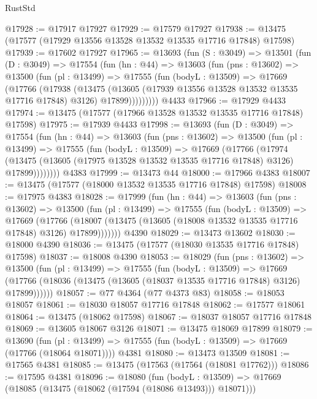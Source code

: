 \begin{lexlean}{RustStd}
\begin{coremodule}
@17928 := @17917 @17927
@17929 := @17579 @17927
@17938 := @13475 (@17577 (@17929 @13556 @13528 @13532 @13535 @17716 @17848) @17598)
@17939 := @17602 @17927
@17965 := @13693
    (fun (S : @3049) =>
    @13501
      (fun (D : @3049) =>
      @17554
        (fun (hn : @44) =>
        @13603
          (fun (pns : @13602) =>
          @13500
            (fun (pl : @13499) =>
            @17555
              (fun (bodyL : @13509) =>
              @17669
                (@17766
                  (@17938
                    (@13475
                      (@13605 (@17939 @13556 @13528 @13532 @13535 @17716 @17848) @3126)
                      @17899)))))))))
    @4433
@17966 := @17929 @4433
@17974 := @13475 (@17577 (@17966 @13528 @13532 @13535 @17716 @17848) @17598)
@17975 := @17939 @4433
@17998 := @13693
    (fun (D : @3049) =>
    @17554
      (fun (hn : @44) =>
      @13603
        (fun (pns : @13602) =>
        @13500
          (fun (pl : @13499) =>
          @17555
            (fun (bodyL : @13509) =>
            @17669
              (@17766
                (@17974
                  (@13475 (@13605 (@17975 @13528 @13532 @13535 @17716 @17848) @3126) @17899))))))))
    @4383
@17999 := @13473 @44
@18000 := @17966 @4383
@18007 := @13475 (@17577 (@18000 @13532 @13535 @17716 @17848) @17598)
@18008 := @17975 @4383
@18028 := @17999
    (fun (hn : @44) =>
    @13603
      (fun (pns : @13602) =>
      @13500
        (fun (pl : @13499) =>
        @17555
          (fun (bodyL : @13509) =>
          @17669
            (@17766
              (@18007 (@13475 (@13605 (@18008 @13532 @13535 @17716 @17848) @3126) @17899)))))))
    @4390
@18029 := @13473 @13602
@18030 := @18000 @4390
@18036 := @13475 (@17577 (@18030 @13535 @17716 @17848) @17598)
@18037 := @18008 @4390
@18053 := @18029
    (fun (pns : @13602) =>
    @13500
      (fun (pl : @13499) =>
      @17555
        (fun (bodyL : @13509) =>
        @17669 (@17766 (@18036 (@13475 (@13605 (@18037 @13535 @17716 @17848) @3126) @17899))))))
@18057 := @77 @4364 (@77 @4373 @83)
@18058 := @18053 @18057
@18061 := @18030 @18057 @17716 @17848
@18062 := @17577 @18061
@18064 := @13475 (@18062 @17598)
@18067 := @18037 @18057 @17716 @17848
@18069 := @13605 @18067 @3126
@18071 := @13475 @18069 @17899
@18079 := @13690
    (fun (pl : @13499) => @17555 (fun (bodyL : @13509) => @17669 (@17766 (@18064 @18071))))
    @4381
@18080 := @13473 @13509
@18081 := @17565 @4381
@18085 := @13475 (@17563 (@17564 (@18081 @17762)))
@18086 := @17595 @4381
@18096 := @18080
    (fun (bodyL : @13509) => @17669 (@18085 (@13475 (@18062 (@17594 (@18086 @13493))) @18071)))

\end{coremodule}
\end{lexlean}
